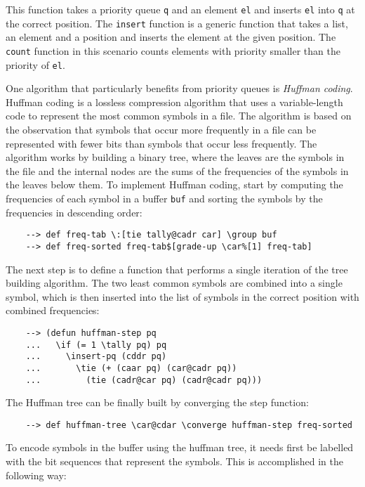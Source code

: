 This function takes a priority queue \verb|q| and an element \verb|el| and inserts \verb|el| into \verb|q| at the correct position. The \verb|insert| function is a generic function that takes a list, an element and a position and inserts the element at the given position. The \verb|count| function in this scenario counts elements with priority smaller than the priority of \verb|el|.

One algorithm that particularly benefits from priority queues is \textit{Huffman coding}. Huffman coding is a lossless compression algorithm that uses a variable-length code to represent the most common symbols in a file. The algorithm is based on the observation that symbols that occur more frequently in a file can be represented with fewer bits than symbols that occur less frequently. The algorithm works by building a binary tree, where the leaves are the symbols in the file and the internal nodes are the sums of the frequencies of the symbols in the leaves below them. To implement Huffman coding, start by computing the frequencies of each symbol in a buffer \verb|buf| and sorting the symbols by the frequencies in descending order:

\begin{Verbatim}
    --> def freq-tab \:[tie tally@cadr car] \group buf
    --> def freq-sorted freq-tab$[grade-up \car%[1] freq-tab]
\end{Verbatim}

The next step is to define a function that performs a single iteration of the tree building algorithm. The two least common symbols are combined into a single symbol, which is then inserted into the list of symbols in the correct position with combined frequencies:

\begin{Verbatim}
    --> (defun huffman-step pq
    ...   \if (= 1 \tally pq) pq
    ...     \insert-pq (cddr pq)
    ...       \tie (+ (caar pq) (car@cadr pq))
    ...         (tie (cadr@car pq) (cadr@cadr pq)))
\end{Verbatim}

The Huffman tree can be finally built by converging the step function:

\begin{Verbatim}
    --> def huffman-tree \car@cdar \converge huffman-step freq-sorted
\end{Verbatim}

To encode symbols in the buffer using the huffman tree, it needs first be labelled with the bit sequences that represent the symbols. This is accomplished in the following way:


